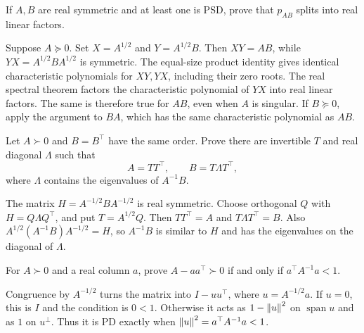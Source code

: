 \begin{problem}\label{ex:09:real-product}
If \(A,B\) are real symmetric and at least one is PSD, prove that
\(p_{AB}\) splits into real linear factors.
\end{problem}
\begin{solution}
Suppose \(A\succeq0\).
Set \(X=A^{1/2}\) and \(Y=A^{1/2}B\).
Then \(XY=AB\), while \(YX=A^{1/2}BA^{1/2}\) is symmetric.
The equal-size product identity gives identical characteristic
polynomials for \(XY,YX\), including their zero roots.
The real spectral theorem factors the characteristic polynomial of
\(YX\) into real linear factors. The same is therefore true for
\(AB\), even when \(A\) is singular.
If \(B\succeq0\), apply the argument to \(BA\), which has the same
characteristic polynomial as \(AB\).
\end{solution}

\begin{problem}\label{ex:09:simultaneous-congruence}
Let \(A\succ0\) and \(B=B^\top\) have the same order.
Prove there are invertible \(T\) and real diagonal \(\Lambda\) such that
\[
 A=TT^\top,\qquad B=T\Lambda T^\top,
\]
where \(\Lambda\) contains the eigenvalues of \(A^{-1}B\).
\end{problem}
\begin{solution}
The matrix \(H=A^{-1/2}BA^{-1/2}\) is real symmetric.
Choose orthogonal \(Q\) with \(H=Q\Lambda Q^\top\), and put
\(T=A^{1/2}Q\).
Then \(TT^\top=A\) and \(T\Lambda T^\top=B\).
Also
\(A^{1/2}(A^{-1}B)A^{-1/2}=H\), so \(A^{-1}B\) is similar to \(H\)
and has the eigenvalues on the diagonal of \(\Lambda\).
\end{solution}

\begin{problem}\label{ex:09:downdate}
For \(A\succ0\) and a real column \(a\), prove
\(A-aa^\top\succ0\) if and only if \(a^\top A^{-1}a<1\).
\end{problem}
\begin{solution}
Congruence by \(A^{-1/2}\) turns the matrix into \(I-uu^\top\),
where \(u=A^{-1/2}a\).
If \(u=0\), this is \(I\) and the condition is \(0<1\).
Otherwise it acts as \(1-\left\lVert u\right\rVert^2\) on \(\operatorname{span}u\)
and as \(1\) on \(u^\perp\).
Thus it is PD exactly when \(\left\lVert u\right\rVert^2=a^\top A^{-1}a<1\).
\end{solution}


